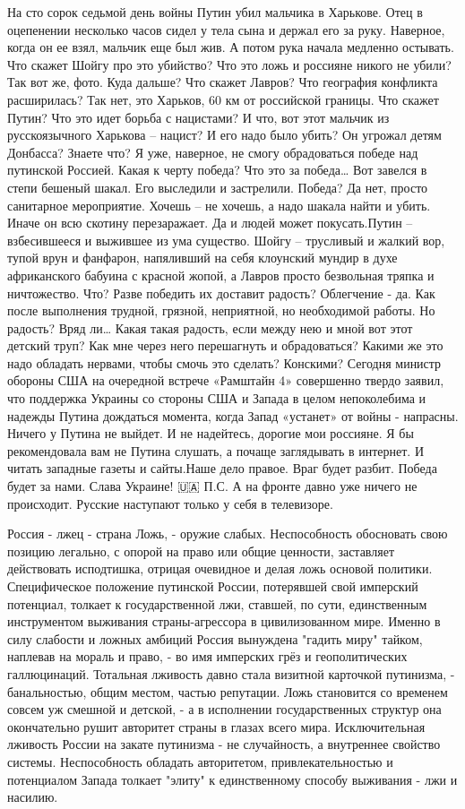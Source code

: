 На сто сорок седьмой день войны Путин убил мальчика в Харькове. Отец в оцепенении несколько часов сидел у тела сына и держал его за руку. Наверное, когда он ее взял, мальчик еще был жив. А потом рука начала медленно остывать.
Что скажет Шойгу про это убийство? Что это ложь и россияне никого не убили? Так вот же, фото. Куда дальше? Что скажет Лавров? Что география конфликта расширилась? Так нет, это Харьков, 60 км от российской границы. Что скажет Путин? Что это идет борьба с нацистами? И что, вот этот мальчик из русскоязычного Харькова – нацист? И его надо было убить? Он угрожал детям Донбасса?
Знаете что? Я уже, наверное, не смогу обрадоваться победе над путинской Россией. Какая к черту победа? Что это за победа… Вот завелся в степи бешеный шакал. Его выследили и застрелили. Победа? Да нет, просто санитарное мероприятие. Хочешь – не хочешь, а надо шакала найти и убить. Иначе он всю скотину перезаражает. Да и людей может покусать.Путин – взбесившееся и выжившее из ума существо. Шойгу – трусливый и жалкий вор, тупой врун и фанфарон, напяливший на себя клоунский мундир в духе африканского бабуина с красной жопой, а Лавров просто безвольная тряпка и ничтожество. Что? Разве победить их доставит радость? Облегчение - да. Как после выполнения трудной, грязной, неприятной, но необходимой работы. Но радость? Вряд ли…
Какая такая радость, если между нею и мной вот этот детский труп? Как мне через него перешагнуть и обрадоваться? Какими же это надо обладать нервами, чтобы смочь это сделать? Конскими?
Сегодня министр обороны США на очередной встрече «Рамштайн 4» совершенно твердо заявил, что поддержка Украины со стороны США и Запада в целом непоколебима и надежды Путина дождаться момента, когда Запад «устанет» от войны - напрасны.
Ничего у Путина не выйдет. И не надейтесь, дорогие мои россияне. Я бы рекомендовала вам не Путина слушать, а почаще заглядывать в интернет. И читать западные газеты и сайты.Наше дело правое. Враг будет разбит. Победа будет за нами.
Слава Украине! 🇺🇦
П.С. А на фронте давно уже ничего не происходит. Русские наступают только у себя в телевизоре.

Россия - лжец - страна Ложь, - оружие слабых. Неспособность обосновать свою
позицию легально, с опорой на право или общие ценности, заставляет действовать
исподтишка, отрицая очевидное и делая ложь основой политики. Специфическое
положение путинской России, потерявшей свой имперский потенциал, толкает к
государственной лжи, ставшей, по сути, единственным инструментом выживания
страны-агрессора в цивилизованном мире. Именно в силу слабости и ложных амбиций
Россия вынуждена "гадить миру" тайком, наплевав на мораль и право, - во имя
имперских грёз и геополитических галлюцинаций. Тотальная лживость давно стала
визитной карточкой путинизма, - банальностью, общим местом, частью репутации.
Ложь становится со временем совсем уж смешной и детской, - а в исполнении
государственных структур она окончательно рушит авторитет страны в глазах всего
мира. Исключительная лживость России на закате путинизма - не случайность, а
внутреннее свойство системы. Неспособность обладать авторитетом,
привлекательностью и потенциалом Запада толкает "элиту" к единственному способу
выживания - лжи и насилию.

